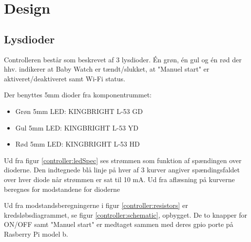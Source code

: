 \section{Design}




\subsection{Lysdioder}

Controlleren består som beskrevet af 3 lysdioder. Én grøn, én gul og én rød der hhv. indikerer at Baby Watch er tændt/slukket, at "Manuel start" er aktiveret/deaktiveret samt Wi-Fi status. 

Der benyttes 5mm dioder fra komponentrummet: 

\begin{itemize}
	\item Grøn 5mm LED: KINGBRIGHT L-53 GD
	\item Gul 5mm LED: KINGBRIGHT L-53 YD
	\item Rød 5mm LED: KINGBRIGHT L-53 HD
\end{itemize}



Ud fra figur \ref{controller:ledSpec} ses strømmen som funktion af spændingen over dioderne. Den indtegnede blå linje på hver af 3 kurver angiver spændingsfaldet over hver diode når strømmen er sat til 10 mA. Ud fra aflæsning på kurverne beregnes for modstandene for dioderne


Ud fra modstandsberegningerne i figur \ref{controller:resistors} er kredsløbsdiagrammet, se figur \ref{controller:schematic}, opbygget. De to knapper for ON/OFF samt "Manuel start" er medtaget sammen med deres gpio porte på Rasberry Pi model b.


